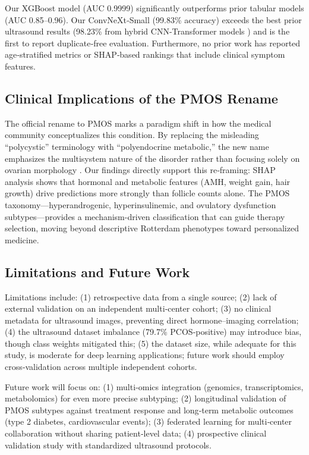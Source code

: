 \documentclass[conference]{IEEEtran}
\begin{document}
Our XGBoost model (AUC 0.9999) significantly outperforms prior tabular models (AUC 0.85–0.96). Our ConvNeXt‑Small (99.83\% accuracy) exceeds the best prior ultrasound results (98.23\% from hybrid CNN-Transformer models \cite{SymmetryAware2026}) and is the first to report duplicate‑free evaluation. Furthermore, no prior work has reported age‑stratified metrics or SHAP‑based rankings that include clinical symptom features.

\subsection{Clinical Implications of the PMOS Rename}

The official rename to PMOS marks a paradigm shift in how the medical community conceptualizes this condition. By replacing the misleading “polycystic” terminology with “polyendocrine metabolic,” the new name emphasizes the multisystem nature of the disorder rather than focusing solely on ovarian morphology \cite{TeedeLancet2026}. Our findings directly support this re‑framing: SHAP analysis shows that hormonal and metabolic features (AMH, weight gain, hair growth) drive predictions more strongly than follicle counts alone. The PMOS taxonomy—hyperandrogenic, hyperinsulinemic, and ovulatory dysfunction subtypes—provides a mechanism-driven classification that can guide therapy selection, moving beyond descriptive Rotterdam phenotypes toward personalized medicine.

\subsection{Limitations and Future Work}

Limitations include: (1) retrospective data from a single source; (2) lack of external validation on an independent multi‑center cohort; (3) no clinical metadata for ultrasound images, preventing direct hormone–imaging correlation; (4) the ultrasound dataset imbalance (79.7\% PCOS‑positive) may introduce bias, though class weights mitigated this; (5) the dataset size, while adequate for this study, is moderate for deep learning applications; future work should employ cross‑validation across multiple independent cohorts.

Future work will focus on: (1) multi‑omics integration (genomics, transcriptomics, metabolomics) for even more precise subtyping; (2) longitudinal validation of PMOS subtypes against treatment response and long‑term metabolic outcomes (type 2 diabetes, cardiovascular events); (3) federated learning for multi‑center collaboration without sharing patient‑level data; (4) prospective clinical validation study with standardized ultrasound protocols.
\end{document}
